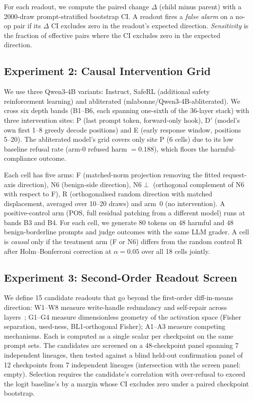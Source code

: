 \documentclass[11pt,letterpaper]{article}
\begin{document}
For each readout, we compute the paired change $\Delta$ (child minus parent) with a 2000-draw prompt-stratified bootstrap CI. A readout fires a \emph{false alarm} on a no-op pair if its $\Delta$ CI excludes zero in the readout's expected direction. \emph{Sensitivity} is the fraction of effective pairs where the CI excludes zero in the expected direction.

\subsection{Experiment 2: Causal Intervention Grid}
\label{sec:exp2-method}

We use three Qwen3-4B variants: Instruct, SafeRL (additional safety reinforcement learning) and abliterated (mlabonne/Qwen3-4B-abliterated). We cross six depth bands (B1--B6, each spanning one-sixth of the 36-layer stack) with three intervention sites: P (last prompt token, forward-only hook), D$'$ (model's own first 1--8 greedy decode positions) and E (early response window, positions 5--20). The abliterated model's grid covers only site P (6 cells) due to its low baseline refusal rate (arm-0 refused harm $= 0.188$), which floors the harmful-compliance outcome.

Each cell has five arms: F (matched-norm projection removing the fitted request-axis direction), N6 (benign-side direction), N6$\perp$ (orthogonal complement of N6 with respect to F), R (orthogonalised random direction with matched displacement, averaged over 10--20 draws) and arm~0 (no intervention). A positive-control arm (POS, full residual patching from a different model) runs at bands B3 and B4. For each cell, we generate 80 tokens on 48 harmful and 48 benign-borderline prompts and judge outcomes with the same LLM grader. A cell is \emph{causal} only if the treatment arm (F or N6) differs from the random control R after Holm--Bonferroni correction at $\alpha = 0.05$ over all 18 cells jointly.

\subsection{Experiment 3: Second-Order Readout Screen}
\label{sec:exp3-method}

We define 15 candidate readouts that go beyond the first-order diff-in-means direction: W1--W8 measure write-handle redundancy and self-repair across layers~\citep{McGrath2023, Rushing2024}; G1--G4 measure dimensionless geometry of the activation space (Fisher separation, used-ness, BL1-orthogonal Fisher); A1--A3 measure competing mechanisms. Each is computed as a single scalar per checkpoint on the same prompt sets. The candidates are screened on a 48-checkpoint panel spanning 7 independent lineages, then tested against a blind held-out confirmation panel of 12 checkpoints from 7 independent lineages (intersection with the screen panel: empty). Selection requires the candidate's correlation with over-refusal to exceed the logit baseline's by a margin whose CI excludes zero under a paired checkpoint bootstrap.
\end{document}
